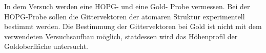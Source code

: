 In dem Versuch werden eine HOPG- und eine Gold- Probe vermessen.
Bei der HOPG-Probe sollen die Gittervektoren der atomaren Struktur
experimentell bestimmt werden. Die Bestimmung der Gittervektoren
bei Gold ist nicht mit dem verwendeten Versuchsaufbau möglich, statdessen
wird das Höhenprofil der Goldoberfläche untersucht.
